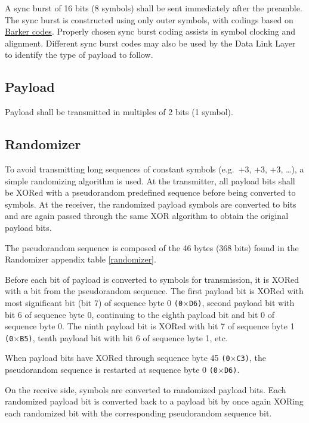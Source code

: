 \documentclass[a4paper,11pt,oneside]{book}
\begin{document}
A sync burst of 16 bits (8 symbols) shall be sent immediately after the preamble. The sync burst is constructed using only outer symbols, with codings based on \href{https://en.wikipedia.org/wiki/Barker_code}{Barker codes}. Properly chosen sync burst coding assists in symbol clocking and alignment. Different sync burst codes may also be used by the Data Link Layer to identify the type of payload to follow.

\subsection{Payload}

Payload shall be transmitted in multiples of 2 bits (1 symbol).

\subsection{Randomizer}

To avoid transmitting long sequences of constant symbols (e.g.~+3, +3, +3, \ldots), a simple randomizing algorithm is used. At the transmitter, all payload bits shall be XORed with a pseudorandom predefined sequence before being converted to symbols. At the receiver, the randomized payload symbols are converted to bits and are again passed through the same XOR algorithm to obtain the original payload bits.

The pseudorandom sequence is composed of the 46 bytes (368 bits) found in the Randomizer appendix table \ref{randomizer}.

Before each bit of payload is converted to symbols for transmission, it is XORed with a bit from the pseudorandom sequence. The first payload bit is XORed with most significant bit (bit 7) of sequence byte 0 \texttt{(0$\times$D6)}, second payload bit with bit 6 of sequence byte 0, continuing to the eighth payload bit and bit 0 of sequence byte 0. The ninth payload bit is XORed with bit 7 of sequence byte 1 \texttt{(0$\times$B5)}, tenth payload bit with bit 6 of sequence byte 1, etc.

When payload bits have XORed through sequence byte 45 \texttt{(0$\times$C3)}, the pseudorandom sequence is restarted at sequence byte 0 \texttt{(0$\times$D6)}.

On the receive side, symbols are converted to randomized payload bits. Each randomized payload bit is converted back to a payload bit by once
again XORing each randomized bit with the corresponding pseudorandom sequence bit.
\end{document}
